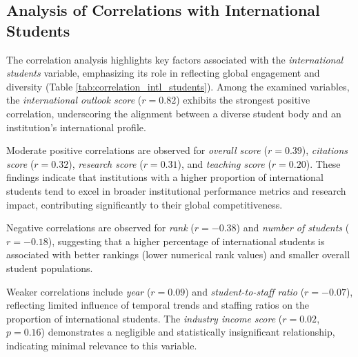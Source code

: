 \documentclass[conference]{IEEEtran}
\begin{document}
\subsection{Analysis of Correlations with International Students}

The correlation analysis highlights key factors associated with the \textit{international students} variable, emphasizing its role in reflecting global engagement and diversity (Table \ref{tab:correlation_intl_students}). Among the examined variables, the \textit{international outlook score} ($r = 0.82$) exhibits the strongest positive correlation, underscoring the alignment between a diverse student body and an institution's international profile.

Moderate positive correlations are observed for \textit{overall score} ($r = 0.39$), \textit{citations score} ($r = 0.32$), \textit{research score} ($r = 0.31$), and \textit{teaching score} ($r = 0.20$). These findings indicate that institutions with a higher proportion of international students tend to excel in broader institutional performance metrics and research impact, contributing significantly to their global competitiveness.

Negative correlations are observed for \textit{rank} ($r = -0.38$) and \textit{number of students} ($r = -0.18$), suggesting that a higher percentage of international students is associated with better rankings (lower numerical rank values) and smaller overall student populations. 

Weaker correlations include \textit{year} ($r = 0.09$) and \textit{student-to-staff ratio} ($r = -0.07$), reflecting limited influence of temporal trends and staffing ratios on the proportion of international students. The \textit{industry income score} ($r = 0.02$, $p = 0.16$) demonstrates a negligible and statistically insignificant relationship, indicating minimal relevance to this variable.
\end{document}
